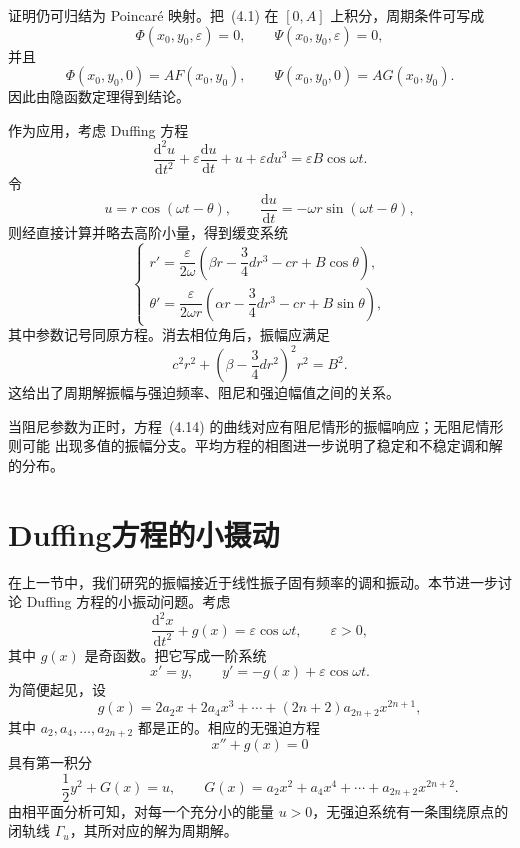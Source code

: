 证明仍可归结为 Poincar\'e 映射。把~(4.1) 在 $[0,A]$ 上积分，周期条件可写成
\[
  \Phi(x_0,y_0,\varepsilon)=0,\qquad \Psi(x_0,y_0,\varepsilon)=0,
\]
并且
\[
  \Phi(x_0,y_0,0)=AF(x_0,y_0),\qquad
  \Psi(x_0,y_0,0)=AG(x_0,y_0).
\]
因此由隐函数定理得到结论。

作为应用，考虑 Duffing 方程
\[
  \frac{\mathrm d^2u}{\mathrm dt^2}+\varepsilon\frac{\mathrm du}{\mathrm dt}
  +u+\varepsilon du^3=\varepsilon B\cos\omega t. \tag{4.10}
\]
令
\[
  u=r\cos(\omega t-\theta),\qquad
  \frac{\mathrm du}{\mathrm dt}=-\omega r\sin(\omega t-\theta),
\]
则经直接计算并略去高阶小量，得到缓变系统
\[
  \begin{cases}
    r'=\dfrac{\varepsilon}{2\omega}\left(\beta r-\dfrac34dr^3
        -cr+B\cos\theta\right),\\[5pt]
    \theta'=\dfrac{\varepsilon}{2\omega r}\left(\alpha r-\dfrac34dr^3
        -cr+B\sin\theta\right),
  \end{cases} \tag{4.12}
\]
其中参数记号同原方程。消去相位角后，振幅应满足
\[
  c^2r^2+\left(\beta-\frac34dr^2\right)^2r^2=B^2. \tag{4.14}
\]
这给出了周期解振幅与强迫频率、阻尼和强迫幅值之间的关系。


当阻尼参数为正时，方程~(4.14) 的曲线对应有阻尼情形的振幅响应；无阻尼情形则可能
出现多值的振幅分支。平均方程的相图进一步说明了稳定和不稳定调和解的分布。


\section{Duffing方程的小摄动}

在上一节中，我们研究的振幅接近于线性振子固有频率的调和振动。本节进一步讨论
Duffing 方程的小振动问题。考虑
\[
  \frac{\mathrm d^2x}{\mathrm dt^2}+g(x)=\varepsilon\cos\omega t,
  \qquad \varepsilon>0, \tag{5.1}
\]
其中 $g(x)$ 是奇函数。把它写成一阶系统
\[
  x'=y,\qquad y'=-g(x)+\varepsilon\cos\omega t. \tag{5.2}
\]
为简便起见，设
\[
  g(x)=2a_2x+2a_4x^3+\cdots+(2n+2)a_{2n+2}x^{2n+1},
\]
其中 $a_2,a_4,\ldots,a_{2n+2}$ 都是正的。相应的无强迫方程
\[
  x''+g(x)=0 \tag{5.3}
\]
具有第一积分
\[
  \frac12y^2+G(x)=u,\qquad G(x)=a_2x^2+a_4x^4+\cdots+a_{2n+2}x^{2n+2}. \tag{5.5}
\]
由相平面分析可知，对每一个充分小的能量 $u>0$，无强迫系统有一条围绕原点的闭轨线
$\Gamma_u$，其所对应的解为周期解。

